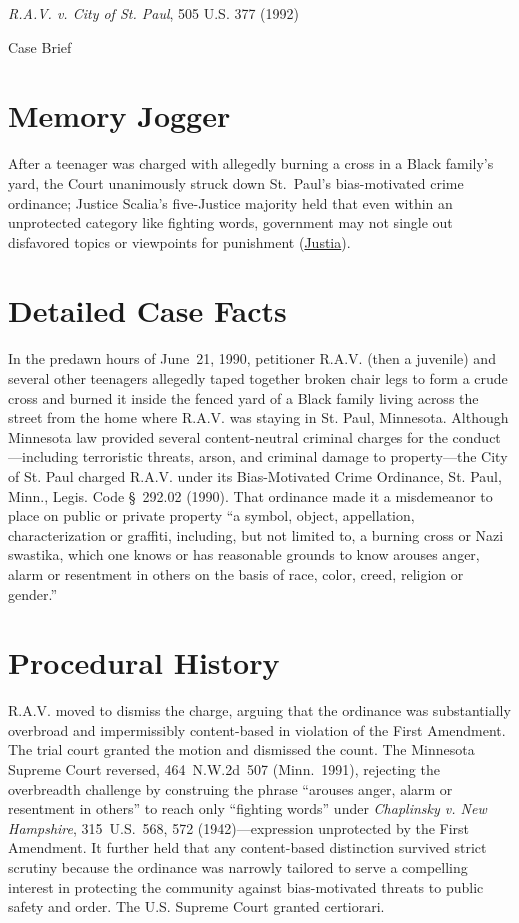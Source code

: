 \documentclass[12pt]{article}
\begin{document}
\begin{center}
{\LARGE \textit{R.A.V. v. City of St. Paul}, 505 U.S. 377 (1992)\par}
\vspace{0.8em}
{\large Case Brief\par}
\end{center}
\vspace{1em}

\section{Memory Jogger}
After a teenager was charged with allegedly burning a cross in a Black family's yard, the Court unanimously struck down St.~Paul's bias-motivated crime ordinance; Justice Scalia's five-Justice majority held that even within an unprotected category like fighting words, government may not single out disfavored topics or viewpoints for punishment (\href{https://supreme.justia.com/cases/federal/us/505/377/}{Justia}).

\section{Detailed Case Facts}
In the predawn hours of June~21, 1990, petitioner R.A.V. (then a juvenile) and several other teenagers allegedly taped together broken chair legs to form a crude cross and burned it inside the fenced yard of a Black family living across the street from the home where R.A.V. was staying in St. Paul, Minnesota. Although Minnesota law provided several content-neutral criminal charges for the conduct---including terroristic threats, arson, and criminal damage to property---the City of St. Paul charged R.A.V. under its Bias-Motivated Crime Ordinance, St. Paul, Minn., Legis. Code \S~292.02 (1990). That ordinance made it a misdemeanor to place on public or private property ``a symbol, object, appellation, characterization or graffiti, including, but not limited to, a burning cross or Nazi swastika, which one knows or has reasonable grounds to know arouses anger, alarm or resentment in others on the basis of race, color, creed, religion or gender.''

\section{Procedural History}
R.A.V. moved to dismiss the charge, arguing that the ordinance was substantially overbroad and impermissibly content-based in violation of the First Amendment. The trial court granted the motion and dismissed the count. The Minnesota Supreme Court reversed, 464~N.W.2d~507 (Minn.~1991), rejecting the overbreadth challenge by construing the phrase ``arouses anger, alarm or resentment in others'' to reach only ``fighting words'' under \textit{Chaplinsky v. New Hampshire}, 315~U.S.~568, 572 (1942)---expression unprotected by the First Amendment. It further held that any content-based distinction survived strict scrutiny because the ordinance was narrowly tailored to serve a compelling interest in protecting the community against bias-motivated threats to public safety and order. The U.S. Supreme Court granted certiorari.
\end{document}
